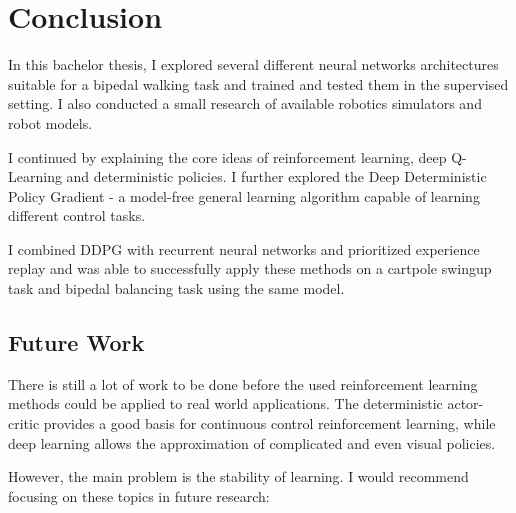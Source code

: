 

\chapter{Conclusion}

In this bachelor thesis, I explored several different neural networks architectures suitable for a bipedal walking task and trained and tested them in the supervised setting. I also conducted a small research of available robotics simulators and robot models.

I continued by explaining the core ideas of reinforcement learning, deep Q-Learning and deterministic policies.
I further explored the Deep Deterministic Policy Gradient - a model-free general learning algorithm capable of learning different control tasks.

I combined DDPG with recurrent neural networks and prioritized experience replay and was able to successfully apply these methods on a cartpole swingup task and bipedal balancing task using the same model.

\section{Future Work}

There is still a lot of work to be done before the used reinforcement learning methods could be applied to real world applications. The deterministic actor-critic provides a good basis for continuous control reinforcement learning, while deep learning allows the approximation of complicated and even visual policies.

However, the main problem is the stability of learning. I would recommend focusing on these topics in future research:

